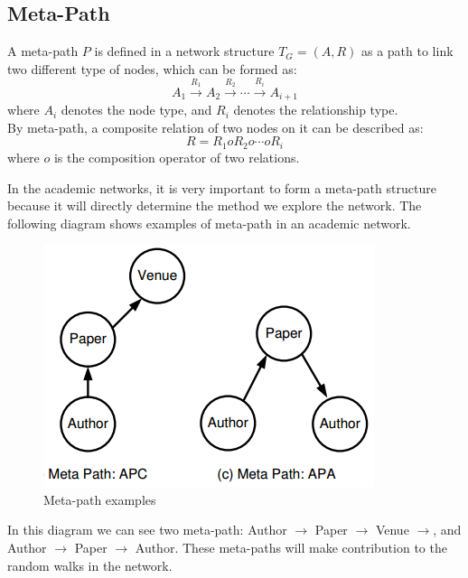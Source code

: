 \documentclass{acmtog} %
\begin{document}
\subsection{Meta-Path}
A meta-path $P$ is defined in a network structure $T_G = (A, R)$ as a path to link two different type of nodes, which can be formed as:
$$A_1\stackrel{R_1}{\longrightarrow}A_2\stackrel{R_2}{\longrightarrow}\cdots\stackrel{R_i}{\longrightarrow}A_{i+1}$$
where $A_i$ denotes the node type, and $R_i$ denotes the relationship type.
\\By meta-path, a composite relation of two nodes on it can be described as:
$$R = R_1 o R_2 o \cdots o R_i$$
where $o$ is the composition operator of two relations\cite{MP}.
\par In the academic networks, it is very important to form a meta-path structure because it will directly determine the method we explore the network. The following diagram shows examples of meta-path in an academic network.
\begin{figure}[H]
  \centering
  \includegraphics[width=0.7\linewidth]{mp.jpg}
  \caption{Meta-path examples}
  \label{2}
\end{figure}
In this diagram we can see two meta-path: Author $\rightarrow$ Paper $\rightarrow$ Venue $\rightarrow$, and Author $\rightarrow$ Paper $\rightarrow$ Author. These meta-paths will make contribution to the random walks in the network.
\end{document}
